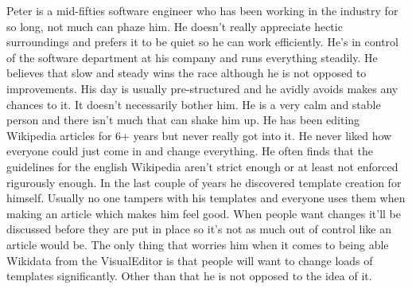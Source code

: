 \documentclass{article}
\begin{document}
Peter is a mid-fifties software engineer who has been working in the industry for so long, not much can phaze him. He doesn't really appreciate hectic surroundings and prefers it to be quiet so he can work efficiently. He's in control of the software department at his company and runs everything steadily. He believes that slow and steady wins the race although he is not opposed to improvements. His day is usually pre-structured and he avidly avoids makes any chances to it. It doesn't necessarily bother him. He is a very calm and stable person and there isn't much that can shake him up. He has been editing Wikipedia articles for 6+ years but never really got into it. He never liked how everyone could just come in and change everything. He often finds that the guidelines for the english Wikipedia aren't strict enough or at least not enforced rigurously enough. In the last couple of years he discovered template creation for himself. Usually no one tampers with his templates and everyone uses them when making an article which makes him feel good. When people want changes it'll be discussed before they are put in place so it's not as much out of control like an article would be. The only thing that worries him when it comes to being able Wikidata from the VisualEditor is that people will want to change loads of templates significantly. Other than that he is not opposed to the idea of it. 
\end{document}
